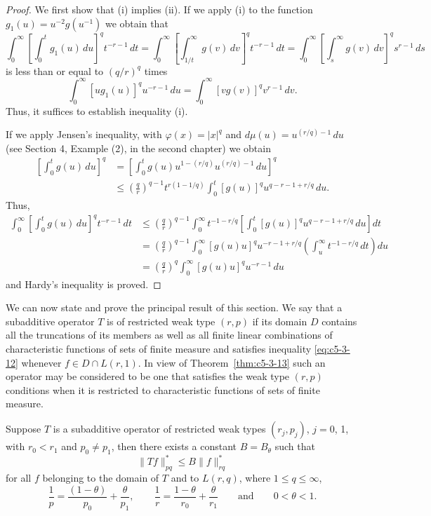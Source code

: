 \begin{proof}
We first show that (i) implies (ii). If we apply (i) to the function
$g_{1}(u) = u^{-2}g(u^{-1})$ we obtain that
\[
\int_{0}^{\infty}\left[\int_{0}^{t}g_{1}(u)\,du\right]^{q}t^{-r-1}\,dt
=\int_{0}^{\infty}\left[\int_{1/t}^{\infty}g(v)\,dv\right]^{q}t^{-r-1}\,dt
=\int_{0}^{\infty}\left[\int_{s}^{\infty}g(v)\,dv\right]^{q}s^{r-1}\,ds
\]
is less than or equal to $(q/r)^{q}$ times
\[
\int_{0}^{\infty}[ug_{1}(u)]^{q}u^{-r-1}\,du
=\int_{0}^{\infty}[vg(v)]^{q}v^{r-1}\,dv.
\]
Thus, it suffices to establish inequality (i).

If we apply Jensen's inequality, with $\varphi(x) = |x|^{q}$ and
$d\mu(u) = u^{(r/q)-1}\,du$ (see Section 4, Example (2), in the second chapter)
we obtain
\begin{align*}
\left[\int_{0}^{t}g(u)\,du\right]^{q}
&=\left[\int_{0}^{t}g(u)u^{1-(r/q)}u^{(r/q)-1}\,du\right]^{q}\\
&\leq\left(\frac{q}{r}\right)^{q-1}t^{r(1-1/q)}
\int_{0}^{t}[g(u)]^{q}u^{q-r-1+r/q}\,du.
\end{align*}
Thus,
\begin{align*}
\int_{0}^{\infty}\left[\int_{0}^{t}g(u)\,du\right]^{q}t^{-r-1}\,dt
&\leq\left(\frac{q}{r}\right)^{q-1}\int_{0}^{\infty}t^{-1-r/q}
\left[\int_{0}^{t}[g(u)]^{q}u^{q-r-1+r/q}\,du\right]dt\\
&=\left(\frac{q}{r}\right)^{q-1}\int_{0}^{\infty}[g(u)u]^{q}u^{-r-1+r/q}
\left(\int_{u}^{\infty}t^{-1-r/q}\,dt\right)du\\
&=\left(\frac{q}{r}\right)^{q}\int_{0}^{\infty}[g(u)u]^{q}u^{-r-1}\,du
\end{align*}
and Hardy's inequality is proved.
\end{proof}

We can now state and prove the principal result of this section. We say that a
subadditive operator $T$ is of restricted weak type $(r, p)$ if its domain $D$
contains all the truncations of its members as well as all finite linear
combinations of characteristic functions of sets of finite measure and satisfies
inequality \eqref{eq:c5-3-12} whenever $f \in D \cap L(r, 1)$. In view of
Theorem~\ref{thm:c5-3-13} such an operator may be considered to be one that
satisfies the weak type $(r, p)$ conditions when it is restricted to
characteristic functions of sets of finite measure.

\begin{theorem}\label{thm:c5-3-15}
Suppose $T$ is a subadditive operator of restricted weak types $(r_{j}, p_{j})$,
$j = 0$, 1, with $r_{0} < r_{1}$ and $p_{0} \neq p_{1}$, then there exists a
constant $B = B_{\theta}$ such that
\[
\|Tf\|_{pq}^{*}\leq B\|f\|_{rq}^{*}
\]
for all $f$ belonging to the domain of $T$ and to $L(r, q)$, where
$1 \leq q \leq \infty$,
\[
\frac{1}{p}=\frac{(1-\theta)}{p_{0}}+\frac{\theta}{p_{1}},\qquad
\frac{1}{r}=\frac{1-\theta}{r_{0}}+\frac{\theta}{r_{1}}
\qquad\text{and}\qquad 0<\theta<1.
\]
\end{theorem}

